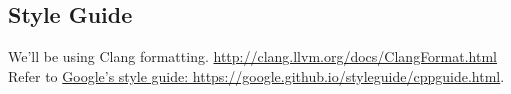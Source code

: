 \subsection*{Style Guide}
We'll be using Clang formatting. \href{http://clang.llvm.org/docs/ClangFormat.html}{http://clang.llvm.org/docs/ClangFormat.html} \\
Refer to \href{https://google.github.io/styleguide/cppguide.html}{Google's style guide: https://google.github.io/styleguide/cppguide.html}.
